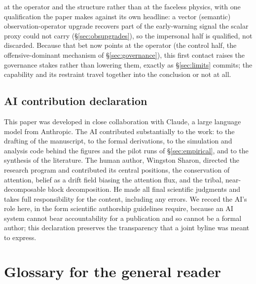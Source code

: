 \documentclass[11pt]{article}
\begin{document}
at the operator and the structure rather than at the faceless physics, with one qualification the paper makes against its own headline: a vector (semantic) observation-operator upgrade recovers part of the early-warning signal the scalar proxy could not carry (\S\ref{sec:obsupgrades}), so the impersonal half is qualified, not discarded. Because that bet now points at the operator (the control half, the offensive-dominant mechanism of \S\ref{sec:governance}), this first contact raises the governance stakes rather than lowering them, exactly as \S\ref{sec:limits} commits; the capability and its restraint travel together into the conclusion or not at all.

\subsection*{AI contribution declaration}

This paper was developed in close collaboration with Claude, a large language model from Anthropic. The AI contributed substantially to the work: to the drafting of the manuscript, to the formal derivations, to the simulation and analysis code behind the figures and the pilot runs of \S\ref{sec:empirical}, and to the synthesis of the literature. The human author, Wingston Sharon, directed the research program and contributed its central positions, the conservation of attention, belief as a drift field biasing the attention flux, and the tribal, near-decomposable block decomposition. He made all final scientific judgments and takes full responsibility for the content, including any errors. We record the AI's role here, in the form scientific authorship guidelines require, because an AI system cannot bear accountability for a publication and so cannot be a formal author; this declaration preserves the transparency that a joint byline was meant to express.

\appendix
\section{Glossary for the general reader}
\label{app:glossary}
\end{document}
